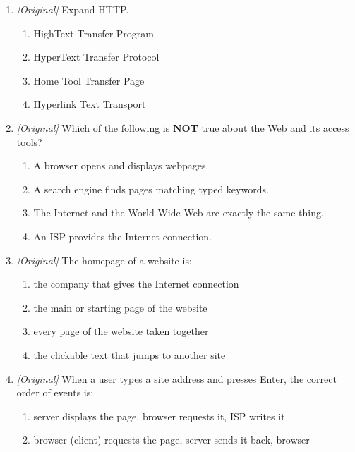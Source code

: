 \begin{enumerate}[label=\textbf{Q\arabic*.}, leftmargin=*]
  \begin{enumerate}[label=\Alph*.]
    \item Uniform Resource Locator
    \item Universal Register Loader
    \item Unified Request Link
    \item Uniform Revision Log
  \end{enumerate}
\item \textit{[Original]} Expand HTTP.
  \begin{enumerate}[label=\Alph*.]
    \item HighText Transfer Program
    \item HyperText Transfer Protocol
    \item Home Tool Transfer Page
    \item Hyperlink Text Transport
  \end{enumerate}
\item \textit{[Original]} Which of the following is \textbf{NOT} true about
  the Web and its access tools?
  \begin{enumerate}[label=\Alph*.]
    \item A browser opens and displays webpages.
    \item A search engine finds pages matching typed keywords.
    \item The Internet and the World Wide Web are exactly the same thing.
    \item An ISP provides the Internet connection.
  \end{enumerate}
\item \textit{[Original]} The homepage of a website is:
  \begin{enumerate}[label=\Alph*.]
    \item the company that gives the Internet connection
    \item the main or starting page of the website
    \item every page of the website taken together
    \item the clickable text that jumps to another site
  \end{enumerate}
\item \textit{[Original]} When a user types a site address and presses Enter,
  the correct order of events is:
  \begin{enumerate}[label=\Alph*.]
    \item server displays the page, browser requests it, ISP writes it
    \item browser (client) requests the page, server sends it back, browser

\end{enumerate}
\end{enumerate}
